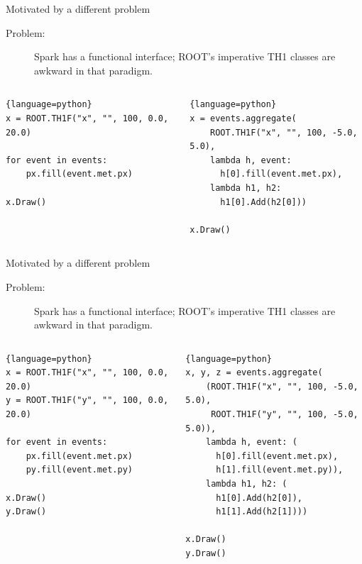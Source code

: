 \documentclass{beamer}
\begin{document}
\begin{frame}[fragile]{Motivated by a different problem}
\begin{description}
\item[Problem:] Spark has a functional interface; ROOT's imperative TH1 classes are awkward in that paradigm.
\end{description}

\begin{columns}
\begin{lstlisting}{language=python}
x = ROOT.TH1F("x", "", 100, 0.0, 20.0)

for event in events:
    px.fill(event.met.px)

x.Draw()
\end{lstlisting}

\begin{lstlisting}{language=python}
x = events.aggregate(
    ROOT.TH1F("x", "", 100, -5.0, 5.0),
    lambda h, event:
      h[0].fill(event.met.px),
    lambda h1, h2:
      h1[0].Add(h2[0]))

x.Draw()
\end{lstlisting}
\end{columns}
\end{frame}

\begin{frame}[fragile]{Motivated by a different problem}
\begin{description}
\item[Problem:] Spark has a functional interface; ROOT's imperative TH1 classes are awkward in that paradigm.
\end{description}

\begin{columns}
\begin{lstlisting}{language=python}
x = ROOT.TH1F("x", "", 100, 0.0, 20.0)
y = ROOT.TH1F("y", "", 100, 0.0, 20.0)

for event in events:
    px.fill(event.met.px)
    py.fill(event.met.py)

x.Draw()
y.Draw()
\end{lstlisting}

\begin{lstlisting}{language=python}
x, y, z = events.aggregate(
    (ROOT.TH1F("x", "", 100, -5.0, 5.0),
     ROOT.TH1F("y", "", 100, -5.0, 5.0)),
    lambda h, event: (
      h[0].fill(event.met.px),
      h[1].fill(event.met.py)),
    lambda h1, h2: (
      h1[0].Add(h2[0]),
      h1[1].Add(h2[1])))

x.Draw()
y.Draw()
\end{lstlisting}
\end{columns}
\end{frame}
\end{document}
